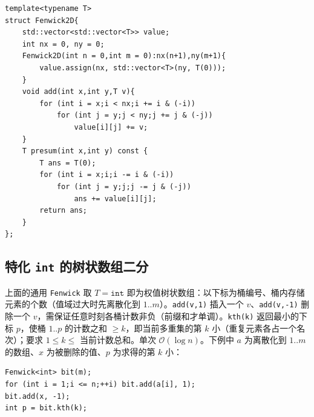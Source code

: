 \begin{lstlisting}
template<typename T>
struct Fenwick2D{
    std::vector<std::vector<T>> value;
    int nx = 0, ny = 0;
    Fenwick2D(int n = 0,int m = 0):nx(n+1),ny(m+1){
        value.assign(nx, std::vector<T>(ny, T(0)));
    }
    void add(int x,int y,T v){
        for (int i = x;i < nx;i += i & (-i))
            for (int j = y;j < ny;j += j & (-j))
                value[i][j] += v;
    }
    T presum(int x,int y) const {
        T ans = T(0);
        for (int i = x;i;i -= i & (-i))
            for (int j = y;j;j -= j & (-j))
                ans += value[i][j];
        return ans;
    }
};
\end{lstlisting}

\subsection{特化 \texttt{int} 的树状数组二分}

上面的通用 \texttt{Fenwick} 取 $T=\texttt{int}$ 即为权值树状数组：以下标为桶编号、桶内存储元素的个数（值域过大时先离散化到 $1..m$）。\texttt{add(v,1)} 插入一个 $v$、\texttt{add(v,-1)} 删除一个 $v$，需保证任意时刻各桶计数非负（前缀和才单调）。\texttt{kth(k)} 返回最小的下标 $p$，使桶 $1..p$ 的计数之和 $\ge k$，即当前多重集的第 $k$ 小（重复元素各占一个名次）；要求 $1\le k\le$ 当前计数总和。单次 $\mathcal{O}(\log n)$。下例中 $a$ 为离散化到 $1..m$ 的数组、$x$ 为被删除的值、$p$ 为求得的第 $k$ 小：

\begin{lstlisting}
Fenwick<int> bit(m);
for (int i = 1;i <= n;++i) bit.add(a[i], 1);
bit.add(x, -1);
int p = bit.kth(k);
\end{lstlisting}